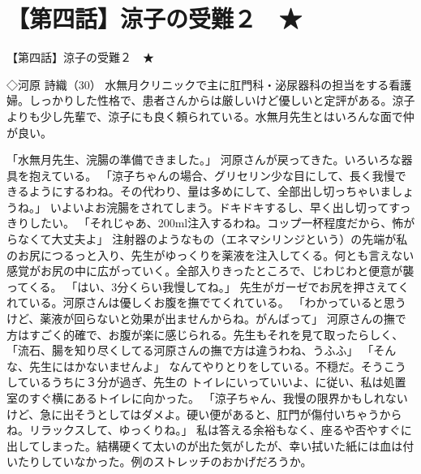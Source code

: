 \section{【第四話】涼子の受難２　★}
【第四話】涼子の受難２　★

◇河原 詩織（30）
水無月クリニックで主に肛門科・泌尿器科の担当をする看護婦。しっかりした性格で、患者さんからは厳しいけど優しいと定評がある。涼子よりも少し先輩で、涼子にも良く頼られている。水無月先生とはいろんな面で仲が良い。

「水無月先生、浣腸の準備できました。」
河原さんが戻ってきた。いろいろな器具を抱えている。
「涼子ちゃんの場合、グリセリン少な目にして、長く我慢できるようにするわね。その代わり、量は多めにして、全部出し切っちゃいましょうね。」
いよいよお浣腸をされてしまう。ドキドキするし、早く出し切ってすっきりしたい。
「それじゃあ、200ml注入するわね。コップ一杯程度だから、怖がらなくて大丈夫よ」
注射器のようなもの（エネマシリンジという）の先端が私のお尻につるっと入り、先生がゆっくりを薬液を注入してくる。何とも言えない感覚がお尻の中に広がっていく。全部入りきったところで、じわじわと便意が襲ってくる。
「はい、3分くらい我慢してね。」
先生がガーゼでお尻を押さえてくれている。河原さんは優しくお腹を撫でてくれている。
「わかっていると思うけど、薬液が回らないと効果が出ませんからね。がんばって」
河原さんの撫で方はすごく的確で、お腹が楽に感じられる。先生もそれを見て取ったらしく、
「流石、腸を知り尽くしてる河原さんの撫で方は違うわね、うふふ」
「そんな、先生にはかないませんよ」
なんてやりとりをしている。不穏だ。そうこうしているうちに３分が過ぎ、先生の トイレにいっていいよ、に従い、私は処置室のすぐ横にあるトイレに向かった。
「涼子ちゃん、我慢の限界かもしれないけど、急に出そうとしてはダメよ。硬い便があると、肛門が傷付いちゃうからね。リラックスして、ゆっくりね。」
私は答える余裕もなく、座るや否やすぐに出してしまった。結構硬くて太いのが出た気がしたが、幸い拭いた紙には血は付いたりしていなかった。例のストレッチのおかげだろうか。

